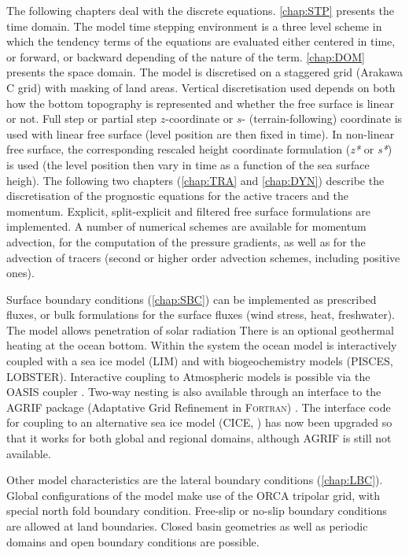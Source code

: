 \documentclass[../tex_main/NEMO_manual]{subfiles}
\begin{document}
The following chapters deal with the discrete equations. \autoref{chap:STP} presents the 
time domain. The model time stepping environment is a three level scheme in which 
the tendency terms of the equations are evaluated either centered  in time, or forward, 
or backward depending of the nature of the term.
\autoref{chap:DOM} presents the space domain. The model is discretised on a staggered 
grid (Arakawa C grid) with masking of land areas. Vertical discretisation used depends 
on both how the bottom topography is represented and whether the free surface is linear or not. 
Full step or partial step $z$-coordinate or $s$- (terrain-following) coordinate is used 
with linear free surface (level position are then fixed in time). In non-linear free surface, 
the corresponding rescaled height coordinate formulation (\textit{z*} or \textit{s*}) is used 
(the level position then vary in time as a function of the sea surface heigh). 
The following two chapters (\autoref{chap:TRA} and \autoref{chap:DYN}) describe the discretisation of the 
prognostic equations for the active tracers and the momentum. Explicit, split-explicit 
and filtered free surface formulations are implemented. 
A number of numerical schemes are available for momentum advection, for the computation 
of the pressure gradients, as well as for the advection of tracers (second or higher 
order advection schemes, including positive ones).

Surface boundary conditions (\autoref{chap:SBC}) can be implemented as prescribed
fluxes, or bulk formulations for the surface fluxes (wind stress, heat, freshwater). The 
model allows penetration of solar radiation  There is an optional geothermal heating at 
the ocean bottom. Within the \NEMO system the ocean model is interactively coupled 
with a sea ice model (LIM) and with biogeochemistry models (PISCES, LOBSTER). 
Interactive coupling to Atmospheric models is possible via the OASIS coupler 
\citep{OASIS2006}. Two-way nesting is also available through an interface to the
AGRIF package (Adaptative Grid Refinement in \textsc{Fortran}) \citep{Debreu_al_CG2008}.
The interface code for coupling to an alternative sea ice model (CICE, \citet{Hunke2008})
has now been upgraded so that it works for both global and regional domains, although AGRIF 
is still not available.

Other model characteristics are the lateral boundary conditions (\autoref{chap:LBC}).  
Global configurations of the model make use of the ORCA tripolar grid, with special north 
fold boundary condition. Free-slip or no-slip boundary conditions are allowed at land 
boundaries. Closed basin geometries as well as periodic domains and open boundary 
conditions are possible. 
\end{document}
